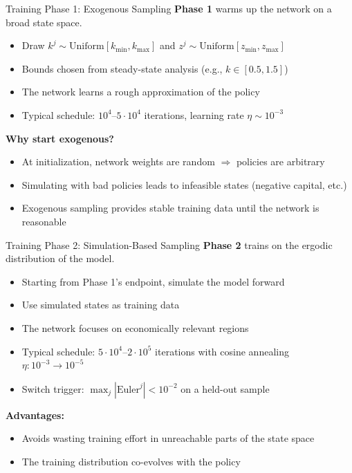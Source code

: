 \documentclass[aspectratio=169,11pt]{beamer}
\newcommand{\emphc}[1]{\textcolor{harvardcrimson}{#1}}
\begin{document}
\begin{frame}{Training Phase 1: Exogenous Sampling}
\textbf{Phase 1} warms up the network on a broad state space.

\vspace{0.4em}
\begin{itemize}
    \item Draw $k^j \sim \text{Uniform}[k_{\min}, k_{\max}]$ and $z^j \sim \text{Uniform}[z_{\min}, z_{\max}]$
    \item Bounds chosen from steady-state analysis (e.g., $k \in [0.5, 1.5]$)
    \item The network learns a \emphc{rough approximation} of the policy
    \item Typical schedule: $10^4$--$5\!\cdot\!10^4$ iterations, learning rate $\eta \sim 10^{-3}$
\end{itemize}

\vspace{0.4em}
\textbf{Why start exogenous?}
\begin{itemize}
    \item At initialization, network weights are random $\Rightarrow$ policies are arbitrary
    \item Simulating with bad policies leads to \emphc{infeasible states} (negative capital, etc.)
    \item Exogenous sampling provides \emphc{stable training data} until the network is reasonable
\end{itemize}
\end{frame}

\begin{frame}{Training Phase 2: Simulation-Based Sampling}
\textbf{Phase 2} trains on the \emphc{ergodic distribution} of the model.

\vspace{0.4em}
\begin{itemize}
    \item Starting from Phase 1's endpoint, \emphc{simulate} the model forward
    \item Use simulated states as training data
    \item The network focuses on \emphc{economically relevant regions}
    \item Typical schedule: $5\!\cdot\!10^4$--$2\!\cdot\!10^5$ iterations with cosine annealing $\eta: 10^{-3} \!\to\! 10^{-5}$
    \item Switch trigger: $\max_j |\mathrm{Euler}^j| < 10^{-2}$ on a held-out sample
\end{itemize}

\vspace{0.4em}
\textbf{Advantages:}
\begin{itemize}
    \item Avoids wasting training effort in unreachable parts of the state space
    \item The training distribution \emphc{co-evolves} with the policy
\end{itemize}
\end{frame}
\end{document}

